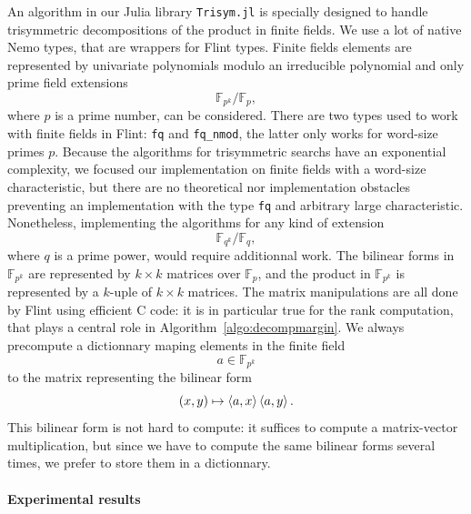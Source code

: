 An algorithm in our Julia library \texttt{Trisym.jl} is specially designed to
handle trisymmetric decompositions of the product in finite fields. We use a lot
of native Nemo types, that are wrappers for Flint types. Finite fields elements
are represented by univariate polynomials modulo an irreducible polynomial and
only prime field extensions
\[
  \mathbb{F}_{p^k}/\mathbb{F}_p,
\]
where $p$ is a prime number, can be considered.
There are two types used to work with finite fields in Flint: \texttt{fq} and
\texttt{fq\_nmod}, the latter only works for word-size primes $p$. Because the
algorithms for trisymmetric searchs have an exponential complexity, we focused
our implementation on finite fields with a word-size characteristic, but there
are no theoretical nor implementation obstacles preventing an
implementation with the type \texttt{fq} and arbitrary large characteristic.
Nonetheless, implementing the algorithms for any kind of extension
\[
  \mathbb{F}_{q^k}/\mathbb{F}_q,
\]
where $q$ is a prime power, would require additionnal work.
The
bilinear forms in $\mathbb{F}_{p^k}$ are represented by $k\times k$ matrices
over $\mathbb{F}_p$, and the product in $\mathbb{F}_{p^k}$ is represented by a
$k$-uple of $k\times k$ matrices. The matrix manipulations are all done by Flint using
efficient C code: it is in particular true for the rank computation, that plays a central role
in Algorithm~\ref{algo:decompmargin}. We always precompute a dictionnary maping
elements in the finite field
\[
  a\in\mathbb{F}_{p^k}
\]
to the matrix representing the bilinear form
\[
  (x, y)\mapsto\left\langle a,x\right\rangle\left\langle a,y\right\rangle.
\]
This bilinear form is not hard to compute: it suffices to compute a
matrix-vector multiplication, but since we have to compute the same bilinear
forms several times, we prefer to store them in a dictionnary.

\paragraph{Experimental results}

